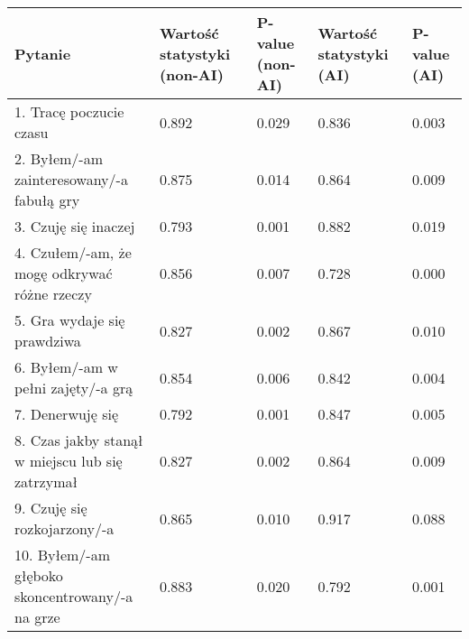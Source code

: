 \begin{table}[h!]
    \begin{center}
        \begin{tabular}{|m{10em}|m{5em}|m{5em}|m{5em}|m{5em}|}
            \hline
            Pytanie                                                           & Wartość statystyki (non-AI) & P-value (non-AI) & Wartość statystyki (AI) & P-value (AI) \\
            \hline
            1. Tracę poczucie czasu                                           & 0.892                       & 0.029            & 0.836                   & 0.003        \\
            2. Byłem/-am \newline zainteresowany/-a fabułą gry                & 0.875                       & 0.014            & 0.864                   & 0.009        \\
            3. Czuję się inaczej                                              & 0.793                       & 0.001            & 0.882                   & 0.019        \\
            4. Czułem/-am, że mogę odkrywać różne rzeczy                      & 0.856                       & 0.007            & 0.728                   & 0.000        \\
            5. Gra wydaje się prawdziwa                                       & 0.827                       & 0.002            & 0.867                   & 0.010        \\
            6. Byłem/-am \newline w pełni zajęty/-a grą                       & 0.854                       & 0.006            & 0.842                   & 0.004        \\
            7. Denerwuję się                                                  & 0.792                       & 0.001            & 0.847                   & 0.005        \\
            8. Czas jakby stanął w miejscu lub się zatrzymał                  & 0.827                       & 0.002            & 0.864                   & 0.009        \\
            9. Czuję się \newline rozkojarzony/-a                             & 0.865                       & 0.010            & 0.917                   & 0.088        \\
            10. Byłem/-am głęboko \newline skoncentrowany/-a \newline na grze & 0.883                       & 0.020            & 0.792                   & 0.001        \\

\end{tabular}
\end{center}
\end{table}
